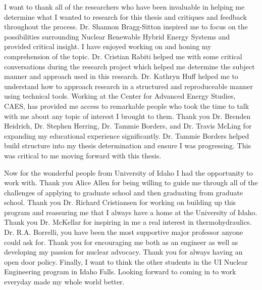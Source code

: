 \documentclass[12pt]{UIdahoMastersThesis}
\begin{document}
I want to thank all of the researchers who have been invaluable in helping me determine what I wanted to research for this thesis and critiques and feedback throughout the process. Dr. Shannon Bragg-Sitton inspired me to focus on the possibilities surrounding Nuclear Renewable Hybrid Energy Systems and provided critical insight. I have enjoyed working on and honing my comprehension of the topic. Dr. Cristian Rabiti helped me with some critical conversations during the research project which helped me determine the subject manner and approach used in this research. Dr. Kathryn Huff helped me to understand how to approach research in a structured and reproduceable manner using technical tools. Working at the Center for Advanced Energy Studies, CAES, has provided me access to remarkable people who took the time to talk with me about any topic of interest I brought to them. Thank you Dr. Brenden Heidrich, Dr. Stephen Herring, Dr. Tammie Borders, and Dr. Travis McLing for expanding my educational experience significantly. Dr. Tammie Borders helped build structure into my thesis determination and ensure I was  progressing.  This was critical to me moving forward with this thesis.


Now for the wonderful people from University of Idaho I had the opportunity to work with.  Thank you Alice Allen for being willing to guide me through all of the challenges of applying to graduate school and then graduating from graduate school. Thank you Dr. Richard Cristiansen for working on building up this program and reassuring me that I always have a home at the University of Idaho. Thank you Dr. McKellar for inspiring in me a real interest in thermohydraulics.  Dr. R.A. Borrelli, you have been the most supportive major professor anyone could ask for. Thank you for encouraging me both as an engineer as well as developing my passion for nuclear advocacy.  Thank you for always having an open door policy. Finally, I want to think the other students in the UI Nuclear Engineering program in Idaho Falls. Looking forward to coming in to work everyday made my whole world better.
%
%
\end{document}
